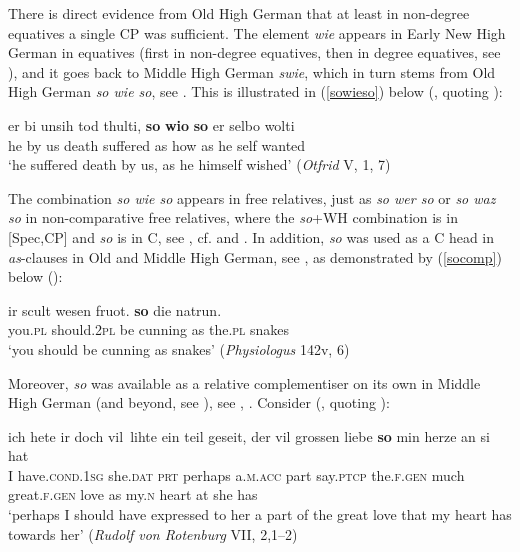 There is direct evidence from Old High German that at least in non-degree equatives a single CP was sufficient. The element \textit{wie} appears in Early New High German in equatives (first in non-degree equatives, then in degree equatives, see \citealt{jaeger2010, jaeger2018}), and it goes back to Middle High German \textit{swie}, which in turn stems from Old High German \textit{so wie so}, see \cite[488]{jaeger2010}. This is illustrated in (\ref{sowieso}) below (\citealt[488, ex. 46]{jaeger2010}, quoting \citealt{schrodt2004}):

\ea \gll er bi unsih tod thulti, \textbf{so} \textbf{wio} \textbf{so} er selbo wolti \label{sowieso}\\
he by us death suffered as how as he self wanted\\
\glt `he suffered death by us, as he himself wished' (\textit{Otfrid} V, 1, 7)
\z

The combination \textit{so wie so} appears in free relatives, just as \textit{so wer so} or \textit{so waz so} in non-comparative free relatives, where the \textit{so}+WH combination is in [Spec,CP] and \textit{so} is in C, see \citet[488]{jaeger2010}, cf. \citet{behaghel1928} and \citet{paul1920band3}. In addition, \textit{so} was used as a C head in \textit{as}-clauses in Old and Middle High German, see \citet[470--472]{jaeger2010}, as demonstrated by (\ref{socomp}) below (\citealt[472, ex. 14]{jaeger2010}):

\ea \gll ir scult wesen fruot. \textbf{so} die natrun. \label{socomp}\\
you.\textsc{pl} should.\textsc{2pl} be cunning as the.\textsc{pl} snakes\\
\glt `you should be cunning as snakes' (\textit{Physiologus} 142v, 6)
\z

Moreover, \textit{so} was available as a relative complementiser on its own in Middle High German (and beyond, see \citealt{brandnerbraeuning2013}), see \citet[405]{paul2011}, \citet[98]{ferraresiweiss2011}. Consider (\citealt[98, ex. 30]{ferraresiweiss2011}, quoting \citealt[414]{paul2007}):

\ea \gll ich hete ir doch vil~lihte ein teil geseit, der vil grossen liebe \textbf{so} min herze an si hat \label{sorel}\\
I have.\textsc{cond.1sg} she.\textsc{dat} \textsc{prt} perhaps a.\textsc{m.acc} part say.\textsc{ptcp} the.\textsc{f.gen} much great.\textsc{f.gen} love as my.\textsc{n} heart at she has\\
\glt `perhaps I should have expressed to her a part of the great love that my heart has towards her' (\textit{Rudolf von Rotenburg} VII, 2,1--2)
\z

